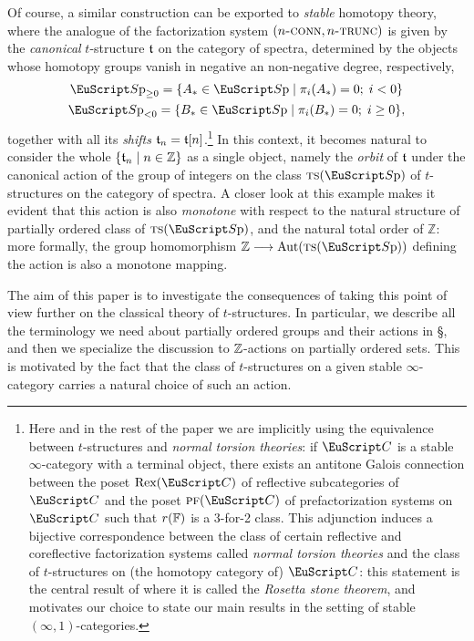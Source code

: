 Of course, a similar construction can be exported to \emph{stable} homotopy theory, where the analogue of the factorization system $(n\textsc{-conn}, n\textsc{-trunc})$ is given by the \emph{canonical} $t$-structure $\mathfrak{t}$ on the category of spectra, determined by the objects whose homotopy groups vanish in negative an non-negative degree, respectively,
\begin{gather*}
\Sp_{\ge 0} = \{  A_* \in \Sp \mid \pi_i(A_*)=0;\; i< 0 \}\\
\Sp_{< 0} = \{ B_* \in \Sp \mid \pi_i(B_*)=0;\; i\ge 0 \},
\end{gather*}
together with all its \emph{shifts} $\mathfrak{t}_n=\mathfrak{t}[n]$.\footnote{Here and in the rest of the paper we are implicitly using the equivalence between $t$-structures and \emph{normal torsion theories}: if $\C$ is a stable $\infty$-category with a terminal object, there exists an antitone Galois connection between the poset $\text{Rex}(\C)$ of reflective subcategories of $\C$ and the poset $\pf(\C)$ of prefactorization systems on $\C$ such that $r(\mathbb{F})$ is a 3-for-2 class. This adjunction induces a bijective correspondence between the class of certain reflective and coreflective factorization systems called \emph{normal torsion theories} and the class of $t$-structures on (the homotopy category of) $\C$: this statement is the central result of \cite{Fiorenza2014} where it is called the \emph{Rosetta stone theorem}, and motivates our choice to state our main results in the setting of stable $(\infty,1)$-categories.} In this context, 
it becomes natural to consider the whole $\{\mathfrak{t}_n\mid n\in\mathbb{Z}\}$ as a single object, 
namely the \emph{orbit} of $\mathfrak{t}$ under 
the canonical action of the group of integers on the class $\ts(\Sp)$ of $t$-structures on the category of spectra.
A closer look at this example 
makes it evident that this action is also \emph{monotone} with respect to the natural structure of partially ordered class of $\ts(\Sp)$, and the natural total order of $\mathbb{Z}$: more formally, the group homomorphism $\mathbb{Z}\to \text{Aut}(\ts(\Sp))$ defining the action is also a monotone mapping.

The aim of this paper is to investigate the consequences of taking this point of view further on the classical theory of $t$-structures.  In particular, we describe all the terminology we need about partially ordered groups and their actions in §, and then we specialize the discussion to $\mathbb{Z}$\hyp{}actions on partially ordered sets. This is motivated by the fact that the class of $t$-structures on a given stable $\infty$-category carries a natural choice of such an action.

